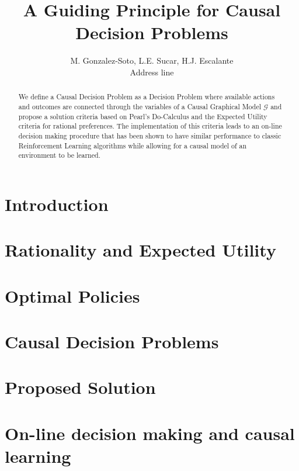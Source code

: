 \documentclass[letterpaper]{article} %
\title{A Guiding Principle for Causal Decision Problems}
\author{M. Gonzalez-Soto, L.E. Sucar, H.J. Escalante\\
Address line
}
\begin{document}
\maketitle
\begin{abstract}
We define a Causal Decision Problem as a Decision Problem where available actions and outcomes are connected through the variables of a Causal Graphical Model $\mathcal{G}$ and propose a solution criteria based on Pearl's Do-Calculus and the Expected Utility criteria for rational preferences. The implementation of this criteria leads to an on-line decision making procedure that has been shown to have similar performance to classic Reinforcement Learning algorithms while allowing for a causal model of an environment to be learned. 
\end{abstract}

\section{Introduction}
\noindent

\section{Rationality and Expected Utility}

\section{Optimal Policies}

\section{Causal Decision Problems}

\section{Proposed Solution}

\section{On-line decision making and causal learning}



\end{document}
